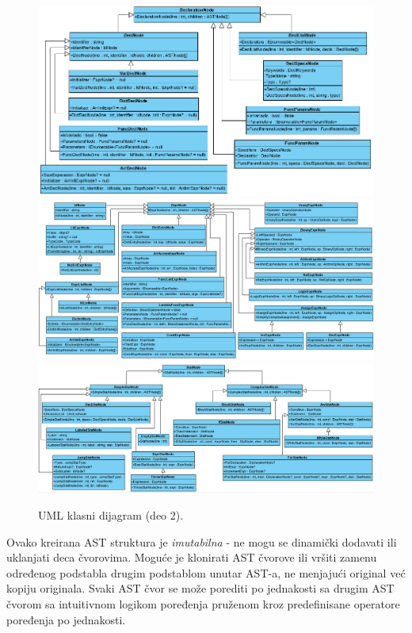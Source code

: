 \begin{figure}[h!]
\centering
\includegraphics[scale=0.65]{images/uml/DeclarationNode.png}
\includegraphics[scale=0.55]{images/uml/ExpressionNode.png}
\includegraphics[scale=0.55]{images/uml/StatementNode.png}
\caption{UML klasni dijagram (deo 2).}
\label{fig:UMLASTNode2}
\end{figure}

Ovako kreirana AST struktura je \emph{imutabilna} - ne mogu se dinamički dodavati ili uklanjati deca čvorovima. Moguće je klonirati AST čvorove ili vršiti zamenu određenog podstabla drugim podstablom unutar AST-a, ne menjajući original već kopiju originala. Svaki AST čvor se može porediti po jednakosti sa drugim AST čvorom sa intuitivnom logikom poređenja pruženom kroz predefinisane operatore poređenja po jednakosti.

